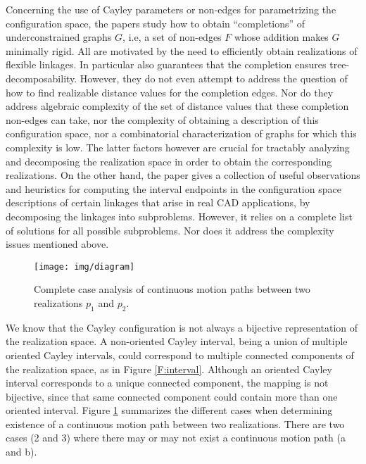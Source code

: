 \documentclass[secthm,amsthm,english]{article}
\theoremstyle{definition}
\theoremstyle{remark}
\begin{document}
Concerning the use of Cayley parameters or non-edges for parametrizing the configuration
space, the papers \cite{bib:JoanArinyo03,bib:survey,bib:ZhangGao06} study how to obtain ``completions'' 
of underconstrained
graphs $G$, i.e, a set of non-edges $F$ whose addition makes $G$ minimally rigid. 
All are motivated by the need to efficiently obtain realizations of flexible linkages. 
In particular \cite{bib:JoanArinyo03} also guarantees that the completion ensures tree-decomposability.
However, they do not even attempt to address the question of how to find realizable
distance values for the completion edges. Nor do they address
algebraic complexity of the set of distance values that these completion non-edges
can take, nor the complexity of obtaining a description of this configuration space,
nor a combinatorial characterization of graphs
for which this complexity is low. 
The latter factors however are crucial for tractably analyzing and decomposing 
the realization space in order to obtain the corresponding realizations. 
On the other hand, 
the paper \cite{bib:hilderick06} gives a collection of useful observations and heuristics for computing
the interval endpoints in the configuration space descriptions of certain linkages that
arise in real CAD applications, by decomposing the linkages into subproblems.
However, it relies on a complete list of solutions for all possible subproblems.
Nor does it address the complexity issues mentioned above.

	\begin{figure}[hbtp]
	\centering
	\texttt{[image: img/diagram]}
	\caption{Complete case analysis of continuous motion paths between two realizations $p_1$ and $p_2$. 
}
	\label{fig:diagram}
	\end{figure}

	We know that the Cayley configuration is not always a bijective representation of the realization space. 
A non-oriented Cayley interval, being a union of multiple oriented Cayley intervals, 
	could correspond to multiple connected components of the realization space, 
	as in Figure \ref{F:interval}. 
Although an oriented Cayley interval corresponds to a unique connected component, 
	the mapping is not bijective, since that same connected component could contain more than one oriented interval.
	Figure \ref{fig:diagram} summarizes the different cases when 
	determining existence of a continuous motion path between two realizations. 
	There are two cases (2 and 3) where there may or may not exist a continuous motion path (a and b).
	
\end{document}
